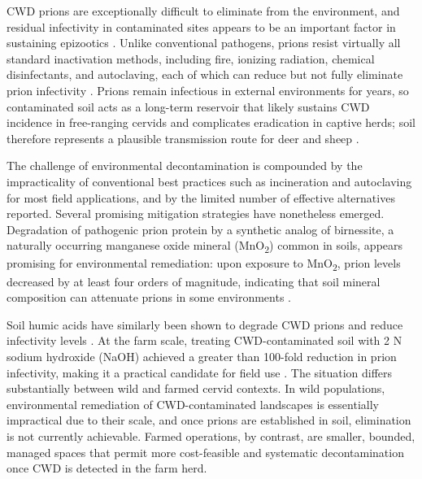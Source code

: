 \documentclass[12pt,a4paper,reqno]{amsart}
\theoremstyle{definition}
\theoremstyle{remark}
\theoremstyle{plain}
\begin{document}
CWD prions are exceptionally difficult to eliminate from the environment, and residual infectivity in contaminated sites appears to be an important factor in sustaining epizootics \cite{miller2004chronic}. Unlike conventional pathogens, prions resist virtually all standard inactivation methods, including fire, ionizing radiation, chemical disinfectants, and autoclaving, each of which can reduce but not fully eliminate prion infectivity \cite{trapotsis2016prion}. Prions remain infectious in external environments for years, so contaminated soil acts as a long-term reservoir that likely sustains CWD incidence in free-ranging cervids and complicates eradication in captive herds; soil therefore represents a plausible transmission route for deer and sheep \cite{miller2004environmental,almberg2011modeling}.

The challenge of environmental decontamination is compounded by the impracticality of conventional best practices such as incineration and autoclaving for most field applications, and by the limited number of effective alternatives reported. Several promising mitigation strategies have nonetheless emerged. Degradation of pathogenic prion protein by a synthetic analog of birnessite, a naturally occurring manganese oxide mineral (MnO\textsubscript{2}) common in soils, appears promising for environmental remediation: upon exposure to MnO\textsubscript{2}, prion levels decreased by at least four orders of magnitude, indicating that soil mineral composition can attenuate prions in some environments \cite{russo2009pathogenic}.

Soil humic acids have similarly been shown to degrade CWD prions and reduce infectivity levels \cite{kuznetsova2018soil}. At the farm scale, treating CWD-contaminated soil with 2 N sodium hydroxide (NaOH) achieved a greater than 100-fold reduction in prion infectivity, making it a practical candidate for field use \cite{kang2019sodium}. The situation differs substantially between wild and farmed cervid contexts. In wild populations, environmental remediation of CWD-contaminated landscapes is essentially impractical due to their scale, and once prions are established in soil, elimination is not currently achievable. Farmed operations, by contrast, are smaller, bounded, managed spaces that permit more cost-feasible and systematic decontamination once CWD is detected in the farm herd.
\end{document}
